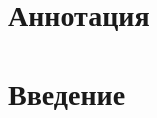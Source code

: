 \documentclass[a4paper, 12pt]{article}
\begin{document}
    
    

    \section*{Аннотация}
    
    \newpage

    \tableofcontents
    \newpage

    \section{Введение}
    
\end{document}
